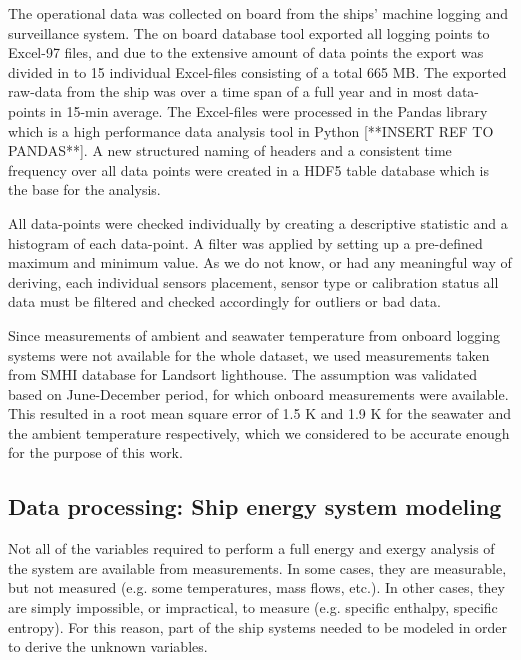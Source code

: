 \documentclass[preprint,12pt]{elsarticle}
\begin{document}
The operational data was collected on board from the ships' machine logging and surveillance system. The on board database tool exported all logging points to Excel-97 files, and due to the extensive amount of data points the export was divided in to 15 individual Excel-files consisting of a total 665 MB. The exported raw-data from the ship was over a time span of a full year and in most data-points in 15-min average. The Excel-files were processed in the Pandas library which is a high performance data analysis tool in Python [**INSERT REF TO PANDAS**]. A new structured naming of headers and a consistent time frequency over all data points were created in a HDF5 table database which is the base for the analysis.

All data-points were checked individually by creating a descriptive statistic and a histogram of each data-point. A filter was applied by setting up a pre-defined maximum and minimum value. As we do not know, or had any meaningful way of deriving, each individual sensors placement, sensor type or calibration status all data must be filtered and checked accordingly for outliers or bad data. 


Since measurements of ambient and seawater temperature from onboard logging systems were not available for the whole dataset, we used measurements taken from SMHI database for Landsort lighthouse. The assumption was validated based on  June-December period, for which onboard measurements were available. This resulted in a root mean square error of 1.5 K and 1.9 K for the seawater and the ambient temperature respectively, which we considered to be accurate enough for the purpose of this work.

\subsection{Data processing: Ship energy system modeling} \label{sec:met:modeling}

Not all of the variables required to perform a full energy and exergy analysis of the system are available from measurements. In some cases, they are measurable, but not measured (e.g. some temperatures, mass flows, etc.). In other cases, they are simply impossible, or impractical, to measure (e.g. specific enthalpy, specific entropy). For this reason, part of the ship systems needed to be modeled in order to derive the unknown variables. 
\end{document}
